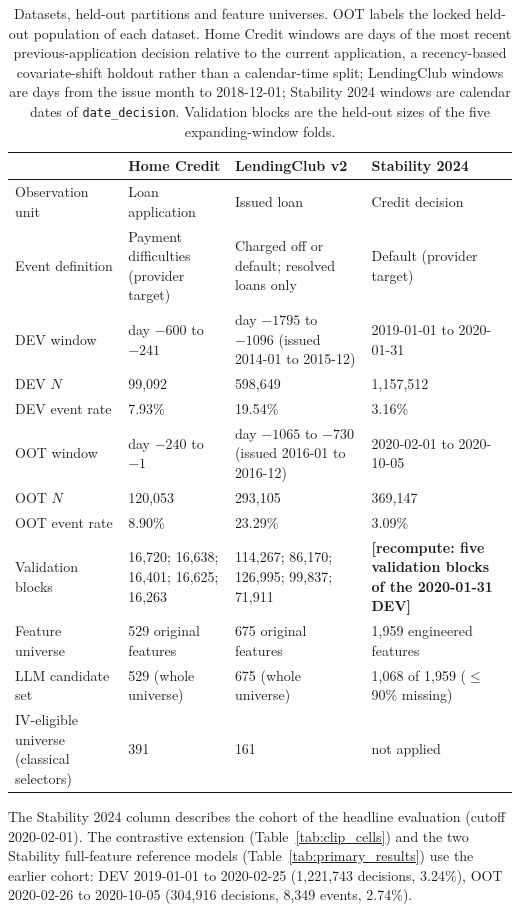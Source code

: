 \documentclass[final,5p,twocolumn]{elsarticle}
\begin{document}
\begin{table}[htbp]
\centering
\footnotesize
\begin{threeparttable}
\caption{Datasets, held-out partitions and feature universes. OOT labels the locked held-out population of each dataset. Home Credit windows are days of the most recent previous-application decision relative to the current application, a recency-based covariate-shift holdout rather than a calendar-time split; LendingClub windows are days from the issue month to 2018-12-01; Stability 2024 windows are calendar dates of \texttt{date\_decision}. Validation blocks are the held-out sizes of the five expanding-window folds.}
\label{tab:datasets}
\begin{tabular}{@{}lL{29mm}L{31mm}L{31mm}@{}}
\toprule
 & Home Credit & LendingClub v2 & Stability 2024 \\
\midrule
Observation unit & Loan application & Issued loan & Credit decision \\
Event definition & Payment difficulties (provider target) & Charged off or default; resolved loans only & Default (provider target) \\
DEV window & day $-600$ to $-241$ & day $-1795$ to $-1096$ (issued 2014-01 to 2015-12) & 2019-01-01 to 2020-01-31 \\
DEV $N$ & 99,092 & 598,649 & 1,157,512 \\
DEV event rate & 7.93\% & 19.54\% & 3.16\% \\
OOT window & day $-240$ to $-1$ & day $-1065$ to $-730$ (issued 2016-01 to 2016-12) & 2020-02-01 to 2020-10-05 \\
OOT $N$ & 120,053 & 293,105 & 369,147 \\
OOT event rate & 8.90\% & 23.29\% & 3.09\% \\
Validation blocks & 16,720; 16,638; 16,401; 16,625; 16,263 & 114,267; 86,170; 126,995; 99,837; 71,911 & \textbf{[recompute: five validation blocks of the 2020-01-31 DEV]} \\ %
Feature universe & 529 original features & 675 original features & 1,959 engineered features \\
LLM candidate set & 529 (whole universe) & 675 (whole universe) & 1,068 of 1,959 ($\le$90\% missing) \\
IV-eligible universe (classical selectors) & 391 & 161 & not applied \\
\bottomrule
\end{tabular}
\begin{tablenotes}\footnotesize
\item The Stability 2024 column describes the cohort of the headline evaluation (cutoff 2020-02-01). The contrastive extension (Table~\ref{tab:clip_cells}) and the two Stability full-feature reference models (Table~\ref{tab:primary_results}) use the earlier cohort: DEV 2019-01-01 to 2020-02-25 (1,221,743 decisions, 3.24\%), OOT 2020-02-26 to 2020-10-05 (304,916 decisions, 8,349 events, 2.74\%).
\end{tablenotes}
\end{threeparttable}
\end{table}
\end{document}
